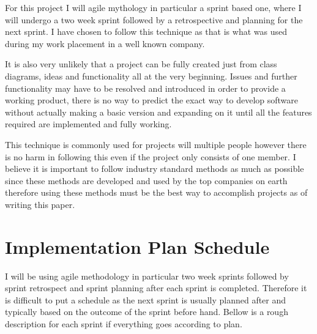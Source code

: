 For this project I will agile mythology in particular a sprint based one, where I will undergo a two week sprint followed by a retrospective and planning for the next sprint. I have chosen to follow this technique as that is what was used during my work placement in a well known company. 

It is also very unlikely that a project can be fully created just from class diagrams, ideas and functionality all at the very beginning. Issues and further functionality may have to be resolved and introduced in order to provide a working product, there is no way to predict the exact way to develop software without actually making a basic version and expanding on it until all the features required are implemented and fully working. 

This technique is commonly used for projects will multiple people however there is no harm in following this even if the project only consists of one member. 
I believe it is important to follow industry standard methods as much as possible since these methods are developed and used by the top companies on earth therefore using these methods must be the best way to accomplish projects as of writing this paper.


\section{Implementation Plan Schedule}
I will be using agile methodology in particular two week sprints followed by sprint retrospect and sprint planning after each sprint is completed. Therefore it is difficult to put a schedule as the next sprint is usually planned after and typically based on the outcome of the sprint before hand. 
Bellow is a rough description for each sprint if everything goes according to plan.


